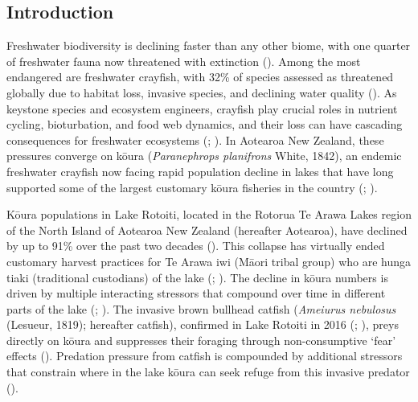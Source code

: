 \documentclass[
  letterpaper,
  DIV=11,
  numbers=noendperiod]{scrartcl}
\begin{document}
\subsection{Introduction}\label{introduction}

Freshwater biodiversity is declining faster than any other biome, with
one quarter of freshwater fauna now threatened with extinction
(). Among the most endangered
are freshwater crayfish, with 32\% of species assessed as threatened
globally due to habitat loss, invasive species, and declining water
quality (). As keystone
species and ecosystem engineers, crayfish play crucial roles in nutrient
cycling, bioturbation, and food web dynamics, and their loss can have
cascading consequences for freshwater ecosystems
(;
). In Aotearoa New Zealand,
these pressures converge on kōura (\emph{Paranephrops planifrons} White,
1842), an endemic freshwater crayfish now facing rapid population
decline in lakes that have long supported some of the largest customary
kōura fisheries in the country (;
).

Kōura populations in Lake Rotoiti, located in the Rotorua Te Arawa Lakes
region of the North Island of Aotearoa New Zealand (hereafter Aotearoa),
have declined by up to 91\% over the past two decades
(). This collapse has
virtually ended customary harvest practices for Te Arawa iwi (Māori
tribal group) who are hunga tiaki (traditional custodians) of the lake
(;
). The decline in kōura
numbers is driven by multiple interacting stressors that compound over
time in different parts of the lake (; ). The invasive
brown bullhead catfish (\emph{Ameiurus nebulosus} (Lesueur, 1819);
hereafter catfish), confirmed in Lake Rotoiti in 2016
(;
), preys directly on kōura and
suppresses their foraging through non-consumptive `fear' effects
(). Predation
pressure from catfish is compounded by additional stressors that
constrain where in the lake kōura can seek refuge from this invasive
predator ().
\end{document}
